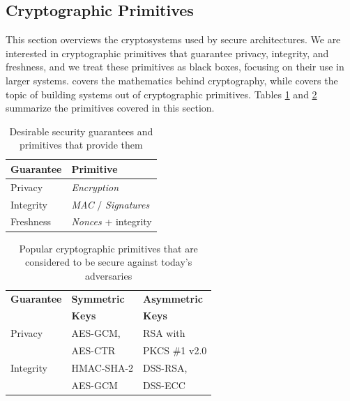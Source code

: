 \subsection{Cryptographic Primitives}
\label{sec:crypto_primitives}

This section overviews the cryptosystems used by secure architectures. We are
interested in cryptographic primitives that guarantee privacy, integrity, and
freshness, and we treat these primitives as black boxes, focusing on their use
in larger systems. \cite{katz2014crypto} covers the mathematics behind
cryptography, while \cite{ferguson2011crypto} covers the topic of building
systems out of cryptographic primitives. Tables \ref{fig:crypto_names}
and \ref{fig:crypto_primitives} summarize the primitives covered in this
section.

\begin{table}[hbt]
  \centering
  \begin{tabular}{| l | l |}
  \hline
  \textbf{Guarantee} & \textbf{Primitive} \\
  \hline
  Privacy & \textit{Encryption} \\
  \hline
  Integrity & \textit{MAC} / \textit{Signatures} \\
  \hline
  Freshness & \textit{Nonces} + integrity \\
  \hline
  \end{tabular}
  \caption{
    Desirable security guarantees and primitives that provide them
  }
  \label{fig:crypto_names}
\end{table}

\begin{table}[hbt]
  \centering
  \begin{tabular}{| l | l | l |}
  \hline
  \textbf{Guarantee} & \textbf{Symmetric} & \textbf{Asymmetric} \\
                     & \textbf{Keys} & \textbf{Keys} \\
  \hline
  Privacy & AES-GCM, & RSA with \\
          & AES-CTR  & PKCS \#1 v2.0 \\
  \hline
  Integrity & HMAC-SHA-2 & DSS-RSA, \\
            & AES-GCM & DSS-ECC \\
  \hline
  \end{tabular}
  \caption{
    Popular cryptographic primitives that are considered to be secure against
    today's adversaries
  }
  \label{fig:crypto_primitives}
\end{table}

